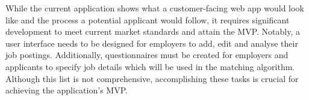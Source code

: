 While the current application shows what a customer-facing web app would look like and the process a potential applicant would follow, it requires significant development to meet current market standards and attain the MVP. Notably, a user interface needs to be designed for employers to add, edit and analyse their job postings. Additionally, questionnaires must be created for employers and applicants to specify job details which will be used in the matching algorithm. Although this list is not comprehensive, accomplishing these tasks is crucial for achieving the application's MVP.
